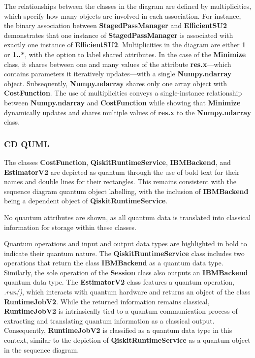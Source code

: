 \documentclass{article}
\begin{document}
The relationships between the classes in the diagram are defined by multiplicities, which specify how many objects are involved in each association. For instance, the binary association between \textbf{StagedPassManager} and \textbf{EfficientSU2} demonstrates that one instance of \textbf{StagedPassManager} is associated with exactly one instance of \textbf{EfficientSU2}. Multiplicities in the diagram are either \textbf{1} or \textbf{1..*}, with the option to label shared attributes. In the case of the \textbf{Minimize} class, it shares between one and many values of the attribute \textbf{res.x}—which contains parameters it iteratively updates—with a single \textbf{Numpy.ndarray} object. Subsequently, \textbf{Numpy.ndarray} shares only one array object with \textbf{CostFunction}. The use of multiplicities conveys a single-instance relationship between \textbf{Numpy.ndarray} and \textbf{CostFunction} while showing that \textbf{Minimize} dynamically updates and shares multiple values of \textbf{res.x} to the \textbf{Numpy.ndarray} class.

\subsubsection{CD QUML}

The classes \textbf{CostFunction}, \textbf{QiskitRuntimeService}, \textbf{IBMBackend}, and \textbf{EstimatorV2} are depicted as quantum through the use of bold text for their names and double lines for their rectangles. This remains consistent with the sequence diagram quantum object labelling, with the inclusion of \textbf{IBMBackend} being a dependent object of \textbf{QiskitRuntimeService}.

No quantum attributes are shown, as all quantum data is translated into classical information for storage within these classes.

Quantum operations and input and output data types are highlighted in bold to indicate their quantum nature. The \textbf{QiskitRuntimeService} class includes two operations that return the class \textbf{IBMBackend} as a quantum data type. Similarly, the sole operation of the \textbf{Session} class also outputs an \textbf{IBMBackend} quantum data type. The \textbf{EstimatorV2} class features a quantum operation, \textit{.run()}, which interacts with quantum hardware and returns an object of the class \textbf{RuntimeJobV2}. While the returned information remains classical, \textbf{RuntimeJobV2} is intrinsically tied to a quantum communication process of extracting and translating quantum information as a classical output. Consequently, \textbf{RuntimeJobV2} is classified as a quantum data type in this context, similar to the depiction of \textbf{QiskitRuntimeService} as a quantum object in the sequence diagram. 
\end{document}
